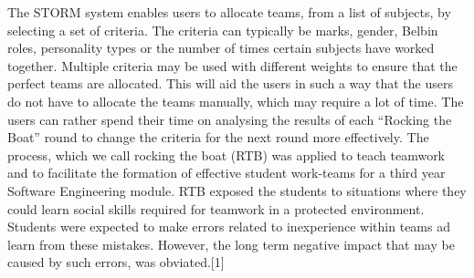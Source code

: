 The STORM system enables users to allocate teams, from a list of subjects, by selecting a set of criteria. The criteria can typically be marks, gender, Belbin roles, personality types or the number of times certain subjects have worked together. Multiple criteria may be used with different weights to ensure that the perfect teams are allocated. This will aid the users in such a way that the users do not have to allocate the teams manually, which may require a lot of time. The users can rather spend their time on analysing the results of each ``Rocking the Boat'' round to change the criteria for the next round more effectively. The process, which we call
rocking the boat
(RTB) was
applied to teach teamwork and to facilitate the formation
of effective student work-teams for a third year Software Engineering module.
RTB exposed the students to situations where they could
learn social skills required for teamwork in a protected environment. Students were expected to make errors related
to inexperience within teams ad learn from these mistakes.
However, the long term negative impact that may be caused
by such errors, was obviated.[1]

\par

